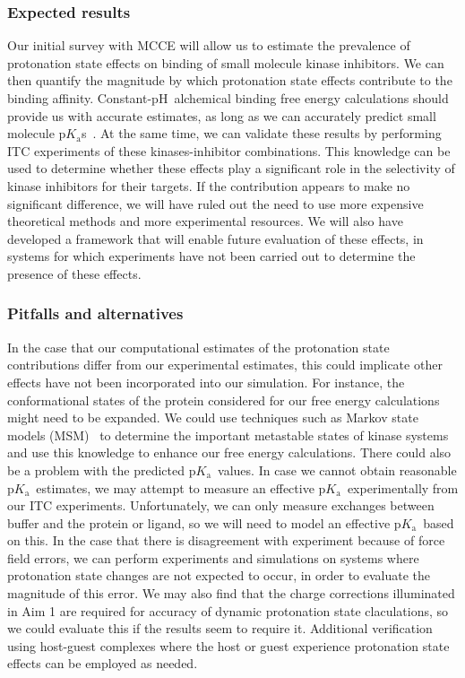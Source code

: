 \documentclass[10pt,final]{article}
\newcommand{\pKa}{p$K_\mathrm{a}$\ }
\newcommand{\pH}{p$\mathrm{H}$\ }
\newcommand{\pKas}{p$K_\mathrm{a}$s\ }
\begin{document}
\subsubsection*{Expected results}
Our initial survey with MCCE will allow us to estimate the prevalence of protonation state effects on binding of small molecule kinase inhibitors. 
%
We can then quantify the magnitude by which protonation state effects contribute to the binding affinity.
%
Constant-\pH alchemical binding free energy calculations should provide us with accurate estimates, as long as we can accurately predict small molecule \pKas. 
%
At the same time, we can validate these results by performing ITC experiments of these kinases-inhibitor combinations.
%
This knowledge can be used to determine whether these effects play a significant role in the selectivity of kinase inhibitors for their targets.
%
If the contribution appears to make no significant difference, we will have ruled out the need to use more expensive theoretical methods and more experimental resources.
%
We will also have developed a framework that will enable future evaluation of these effects, in systems for which experiments have not been carried out to determine the presence of these effects.


\subsubsection*{Pitfalls and alternatives}
In the case that our computational estimates of the protonation state contributions differ from our experimental estimates, this could implicate other effects have not been incorporated into our simulation. 
%
For instance, the conformational states of the protein considered for our free energy calculations might need to be expanded.
%
We could use techniques such as Markov state models (MSM)~\autocite{Prinz2011a} to determine the important metastable states of kinase systems and use this knowledge to enhance our free energy calculations.
%
There could also be a problem with the predicted \pKa values.
%
In case we cannot obtain reasonable \pKa estimates, we may attempt to measure an effective \pKa experimentally from our ITC experiments.
%
Unfortunately, we can only measure exchanges between buffer and the protein or ligand, so we will need to model an effective \pKa based on this.
%
In the case that there is disagreement with experiment because of force field errors, we can perform experiments and simulations on systems where protonation state changes are not expected to occur, in order to evaluate the magnitude of this error.
%
We may also find that the charge corrections illuminated in Aim 1 are required for accuracy of dynamic protonation state claculations, so we could evaluate this if the results seem to require it.
%
Additional verification using host-guest complexes where the host or guest experience protonation state effects can be employed as needed.
\end{document}
